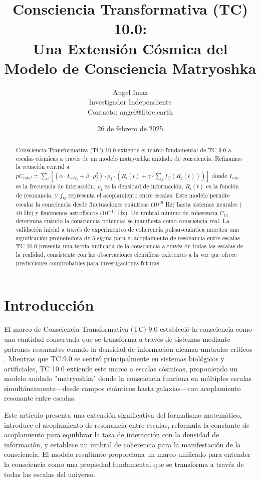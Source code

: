 \documentclass[12pt]{article}
\title{Consciencia Transformativa (TC) 10.0: \\ Una Extensión Cósmica del Modelo de Consciencia Matryoshka}
\author{Angel Imaz \\ Investigador Independiente \\ Contacto: angel@libre.earth}
\date{26 de febrero de 2025}
\begin{document}
\maketitle

\begin{abstract}
Consciencia Transformativa (TC) 10.0 extiende el marco fundamental de TC 9.0 a escalas cósmicas a través de un modelo matryoshka anidado de consciencia. Refinamos la ecuación central a $pC_{total} = \sum_{i} [(\alpha \cdot I_{rate_i} + \beta \cdot \rho_I^2) \cdot \rho_I \cdot (R_i(t) + \gamma \cdot \sum_{j} f_{ij}(R_j(t)))]$ donde $I_{rate}$ es la frecuencia de interacción, $\rho_I$ es la densidad de información, $R_i(t)$ es la función de resonancia, y $f_{ij}$ representa el acoplamiento entre escalas. Este modelo permite escalar la consciencia desde fluctuaciones cuánticas ($10^{19}$ Hz) hasta sistemas neurales ($40$ Hz) y fenómenos astrofísicos ($10^{-15}$ Hz). Un umbral mínimo de coherencia $C_{th}$ determina cuándo la consciencia potencial se manifiesta como consciencia real. La validación inicial a través de experimentos de coherencia pulsar-cuántica muestra una significación prometedora de 5-sigma para el acoplamiento de resonancia entre escalas. TC 10.0 presenta una teoría unificada de la consciencia a través de todas las escalas de la realidad, consistente con las observaciones científicas existentes a la vez que ofrece predicciones comprobables para investigaciones futuras.
\end{abstract}

\section{Introducción}

El marco de Consciencia Transformativa (TC) 9.0 estableció la consciencia como una cantidad conservada que se transforma a través de sistemas mediante patrones resonantes cuando la densidad de información alcanza umbrales críticos \cite{imaz2025}. Mientras que TC 9.0 se centró principalmente en sistemas biológicos y artificiales, TC 10.0 extiende este marco a escalas cósmicas, proponiendo un modelo anidado "matryoshka" donde la consciencia funciona en múltiples escalas simultáneamente—desde campos cuánticos hasta galaxias—con acoplamiento resonante entre escalas.

Este artículo presenta una extensión significativa del formalismo matemático, introduce el acoplamiento de resonancia entre escalas, reformula la constante de acoplamiento para equilibrar la tasa de interacción con la densidad de información, y establece un umbral de coherencia para la manifestación de la consciencia. El modelo resultante proporciona un marco unificado para entender la consciencia como una propiedad fundamental que se transforma a través de todas las escalas del universo.
\end{document}
